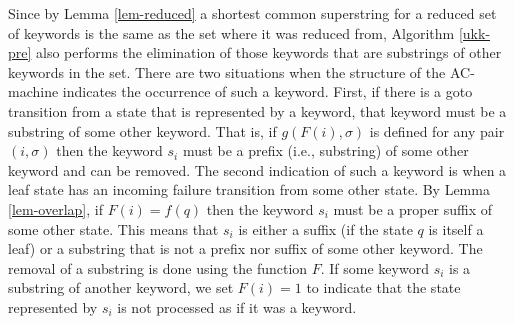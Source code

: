\documentclass[english,twoside,censored,csm,algorithms-track-2020]{HYthesisML}
\theoremstyle{plain}
\theoremstyle{definition}
\begin{document}
\vspace{1cm}
Since by Lemma \ref{lem-reduced} a shortest common superstring for a reduced set of keywords
is the same as the set where it was reduced from, Algorithm \ref{ukk-pre} also performs
the elimination of those keywords that are substrings of other keywords in the set. There are two
situations when the structure of the AC-machine indicates the occurrence of such a keyword. First,
if there is a goto transition from a state that is represented by a keyword, that keyword
must be a substring of some other keyword. That is, if $g(F(i),\sigma)$ is defined for any pair
$(i,\sigma)$ then the keyword $s_i$ must be a prefix (i.e., substring) of some other keyword and can be
removed. The second indication of such a keyword is when a leaf state has an incoming failure
transition from some other state. By Lemma \ref{lem-overlap}, if $F(i) = f(q)$ then the keyword
$s_i$ must be a proper suffix of some other state. This means that $s_i$ is either a suffix
(if the state $q$ is itself a leaf) or a substring that is not a prefix nor suffix of some other
keyword. The removal of a substring is done using the function $F$. If some keyword
$s_i$ is a substring of another keyword, we set $F(i)=1$ to indicate that the state represented
by $s_i$ is not processed as if it was a keyword.
\end{document}
